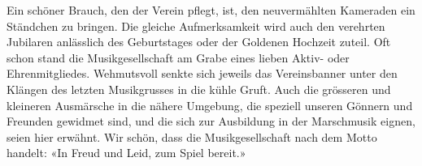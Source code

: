 \begin{multicols}{2}
    Ein schöner Brauch, den der Verein pflegt, ist, den
    neuvermählten Kameraden ein Ständchen zu bringen.
    Die gleiche Aufmerksamkeit wird auch den verehrten
    Jubilaren anlässlich des Geburtstages oder der Goldenen
    Hochzeit zuteil. Oft schon stand die Musikgesellschaft
    am Grabe eines lieben Aktiv- oder Ehrenmitgliedes.
    Wehmutsvoll senkte sich jeweils das Vereinsbanner
    unter den Klängen des letzten Musikgrusses in die kühle
    Gruft. Auch die grösseren und kleineren Ausmärsche
    in die nähere Umgebung, die speziell unseren Gönnern
    und Freunden gewidmet sind, und die sich zur Ausbildung in der Marschmusik eignen, seien hier erwähnt.
    Wir schön, dass die Musikgesellschaft nach dem Motto
    handelt: «In Freud und Leid, zum Spiel bereit.»


\end{multicols}
